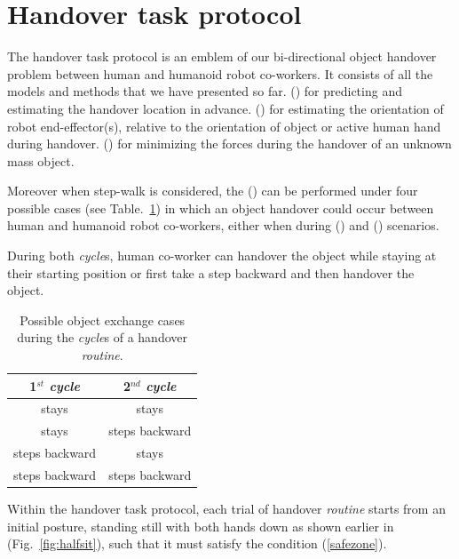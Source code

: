 \clearpage

\section{Handover task protocol}

The handover task protocol is an emblem of our bi-directional object handover problem between human and humanoid robot co-workers. It consists of all the models and methods that we have presented so far. () for predicting and estimating the handover location in advance. () for estimating the orientation of robot end-effector(s), relative to the orientation of object or active human hand during handover. () for minimizing the forces during the handover of an unknown mass object.

Moreover when step-walk is considered, the () can be performed under four possible cases (see Table.~\ref{walkTable}) in which an object handover could occur between human and humanoid robot co-workers, either when during () and () scenarios.

\begin{table}[hbt]
	\caption{Possible object exchange cases during the \textit{cycle}s of a handover \textit{routine}.}
	{During both \textit{cycle}s, human co-worker can handover the object while staying at their starting position or first take a step backward and then handover the object.}
	\label{walkTable}
	\begin{center}
		\begin{tabular}{| c | c|}
			\hline  
			{\bf 1${}^{st}$ \textit{cycle}} & {\bf 2${}^{nd}$ \textit{cycle}} \\ 
			\hline			
			stays &  stays  \\ 
			\hline			
			stays &  steps backward  \\
			\hline			
			steps backward & stays  \\ 
			\hline			
			steps backward & steps backward  \\ 
			\hline 			
		\end{tabular} 
	\end{center}
\end{table}

Within the handover task protocol, each trial of handover \textit{routine} starts from an initial posture, standing still with both hands down as shown earlier in (Fig.~\ref{fig:halfsit}), such that it must satisfy the condition (\ref{safezone}). 

